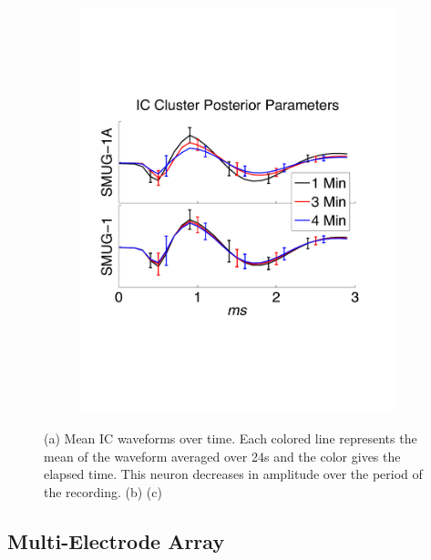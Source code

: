 \begin{center}
\begin{figure}
\begin{subfigure}[b]{.33\textwidth}
\includegraphics[width=\textwidth]{../figs/new/ARvsStationary.pdf}
\caption{}
\label{fig:AR}
\end{subfigure}
\caption{
(a) Mean IC waveforms over time.  Each colored line represents the mean of the waveform averaged over 24s and the color gives the elapsed time.  This neuron decreases in amplitude over the period of the recording. 
(b) 
(c) 
}
\end{figure}
\end{center}

\subsection{Multi-Electrode Array} \label{sub:multi}



